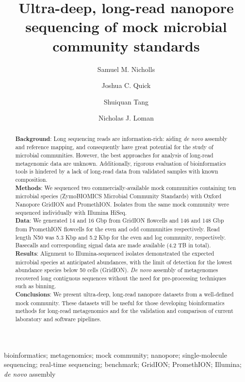 \documentclass[a4paper,num-refs]{oup-contemporary}
\title{Ultra-deep, long-read nanopore sequencing of mock microbial community standards}
\author[1\authfn{2}]{Samuel M. Nicholls}
\author[1\authfn{2}]{Joshua C. Quick}
\author[2]{Shuiquan Tang}
\author[1\authfn{1}]{Nicholas J. Loman}
\affil[1]{Institute of Microbiology and Infection, School of Biosciences, University of Birmingham, UK}
\affil[2]{Zymo Research Corporation, Irvine, California, USA}
\begin{document}
\begin{frontmatter}
\maketitle
\begin{abstract}
\textbf{Background}: 
Long sequencing reads are information-rich: aiding \textit{de novo} assembly and reference mapping, and consequently have great potential for the study of microbial communities. However, the best approaches for analysis of long-read metagenomic data are unknown. Additionally, rigorous evaluation of bioinformatics tools is hindered by a lack of long-read data from validated samples with known composition.  \\
\textbf{Methods}: We sequenced two commercially-available mock communities containing ten microbial species (ZymoBIOMICS Microbial Community Standards) with Oxford Nanopore GridION and PromethION. Isolates from the same mock community were sequenced individually with Illumina HiSeq. \\
\textbf{Data}: We generated 14 and 16 Gbp from GridION flowcells and 146 and 148 Gbp from PromethION flowcells for the even and odd communities respectively. Read length N50 was 5.3 Kbp and 5.2 Kbp for the even and log community, respectively. Basecalls and corresponding signal data are made available (4.2 TB in total).
\\
\textbf{Results}: Alignment to Illumina-sequenced isolates demonstrated the expected microbial species at anticipated abundances, with the limit of detection for the lowest abundance species below 50 cells (GridION). \textit{De novo} assembly of metagenomes recovered long contiguous sequences without the need for pre-processing techniques such as binning.
\\
\textbf{Conclusions}: We present ultra-deep, long-read nanopore datasets from a well-defined mock community. These datasets will be useful for those developing bioinformatics methods for long-read metagenomics and for the validation and comparison of current laboratory and software pipelines. 

\end{abstract}
\begin{keywords}
bioinformatics; metagenomics; mock community; nanopore; single-molecule sequencing; real-time sequencing; benchmark; GridION; PromethION; Illumina; \textit{de novo} assembly
\end{keywords}
\end{frontmatter}
\end{document}

